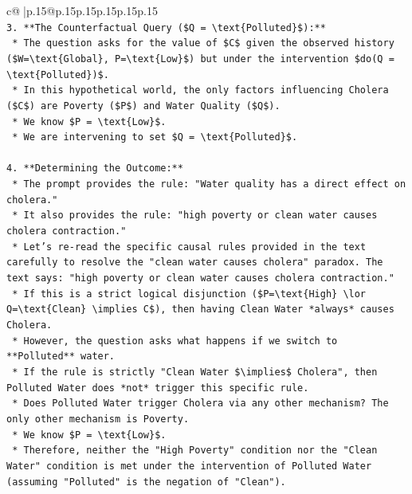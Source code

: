\documentclass{article}
\begin{document}
{\begin{supertabular}{c@{$\;$}|p{.15\linewidth}@{}p{.15\linewidth}p{.15\linewidth}p{.15\linewidth}p{.15\linewidth}p{.15\linewidth}}
{{{\\ 
\texttt{3.  **The Counterfactual Query (\$Q = \textbackslash{}text\{Polluted\}\$):**} \\
\texttt{    *   The question asks for the value of \$C\$ given the observed history (\$W=\textbackslash{}text\{Global\}, P=\textbackslash{}text\{Low\}\$) but under the intervention \$do(Q = \textbackslash{}text\{Polluted\})\$.} \\
\texttt{    *   In this hypothetical world, the only factors influencing Cholera (\$C\$) are Poverty (\$P\$) and Water Quality (\$Q\$).} \\
\texttt{    *   We know \$P = \textbackslash{}text\{Low\}\$.} \\
\texttt{    *   We are intervening to set \$Q = \textbackslash{}text\{Polluted\}\$.} \\
\\ 
\texttt{4.  **Determining the Outcome:**} \\
\texttt{    *   The prompt provides the rule: "Water quality has a direct effect on cholera."} \\
\texttt{    *   It also provides the rule: "high poverty or clean water causes cholera contraction."} \\
\texttt{    *   Let's re{-}read the specific causal rules provided in the text carefully to resolve the "clean water causes cholera" paradox. The text says: "high poverty or clean water causes cholera contraction."} \\
\texttt{        *   If this is a strict logical disjunction (\$P=\textbackslash{}text\{High\} \textbackslash{}lor Q=\textbackslash{}text\{Clean\} \textbackslash{}implies C\$), then having Clean Water *always* causes Cholera.} \\
\texttt{        *   However, the question asks what happens if we switch to **Polluted** water.} \\
\texttt{        *   If the rule is strictly "Clean Water \$\textbackslash{}implies\$ Cholera", then Polluted Water does *not* trigger this specific rule.} \\
\texttt{        *   Does Polluted Water trigger Cholera via any other mechanism? The only other mechanism is Poverty.} \\
\texttt{        *   We know \$P = \textbackslash{}text\{Low\}\$.} \\
\texttt{        *   Therefore, neither the "High Poverty" condition nor the "Clean Water" condition is met under the intervention of Polluted Water (assuming "Polluted" is the negation of "Clean").} \\
}}}
\end{supertabular}}
\end{document}

